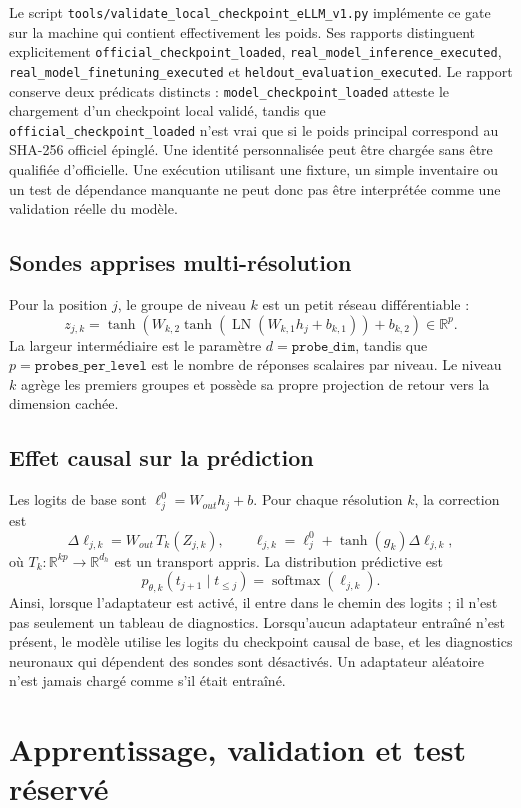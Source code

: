 \documentclass[11pt,a4paper]{article}
\newcommand{\R}{\mathbb R}\newcommand{\X}{\mathcal X}\newcommand{\Pctx}{\mathcal P}\newcommand{\F}{\mathcal F}\newcommand{\Lobs}{\mathcal L}\newcommand{\Cl}{\operatorname{Cl}}\newcommand{\Aff}{\operatorname{Aff}}\newcommand{\rank}{\operatorname{rank}}\newcommand{\softmax}{\operatorname{softmax}}\newcommand{\CE}{\operatorname{CE}}\newcommand{\supp}{\operatorname{supp}}
\begin{document}
Le script \texttt{tools/validate\_local\_checkpoint\_eLLM\_v1.py} implémente ce gate sur la machine qui contient effectivement les poids. Ses rapports distinguent explicitement \texttt{official\_checkpoint\_loaded}, \texttt{real\_model\_inference\_executed}, \texttt{real\_model\_finetuning\_executed} et \texttt{heldout\_evaluation\_executed}. Le rapport conserve deux prédicats distincts : \texttt{model\_checkpoint\_loaded} atteste le chargement d'un checkpoint local validé, tandis que \texttt{official\_checkpoint\_loaded} n'est vrai que si le poids principal correspond au SHA-256 officiel épinglé. Une identité personnalisée peut être chargée sans être qualifiée d'officielle. Une exécution utilisant une fixture, un simple inventaire ou un test de dépendance manquante ne peut donc pas être interprétée comme une validation réelle du modèle.

\subsection{Sondes apprises multi-résolution}
Pour la position \(j\), le groupe de niveau \(k\) est un petit réseau différentiable :
\[
z_{j,k}=\tanh\!\left(W_{k,2}\tanh\!\left(\operatorname{LN}(W_{k,1}h_j+b_{k,1})\right)+b_{k,2}\right)\in\R^p.
\]
La largeur intermédiaire est le paramètre \(d=\texttt{probe\_dim}\), tandis que \(p=\texttt{probes\_per\_level}\) est le nombre de réponses scalaires par niveau. Le niveau \(k\) agrège les premiers groupes et possède sa propre projection de retour vers la dimension cachée.

\subsection{Effet causal sur la prédiction}
Les logits de base sont \(\ell_j^0=W_{out}h_j+b\). Pour chaque résolution \(k\), la correction est
\[
\Delta\ell_{j,k}=W_{out}\,T_k(Z_{j,k}),\qquad
\ell_{j,k}=\ell_j^0+\tanh(g_k)\Delta\ell_{j,k},
\]
où \(T_k:\R^{kp}\to\R^{d_h}\) est un transport appris. La distribution prédictive est
\[
p_{\theta,k}(t_{j+1}\mid t_{\le j})=\softmax(\ell_{j,k}).
\]
Ainsi, lorsque l'adaptateur est activé, il entre dans le chemin des logits ; il n'est pas seulement un tableau de diagnostics. Lorsqu'aucun adaptateur entraîné n'est présent, le modèle utilise les logits du checkpoint causal de base, et les diagnostics neuronaux qui dépendent des sondes sont désactivés. Un adaptateur aléatoire n'est jamais chargé comme s'il était entraîné.

\section{Apprentissage, validation et test réservé}
\end{document}
